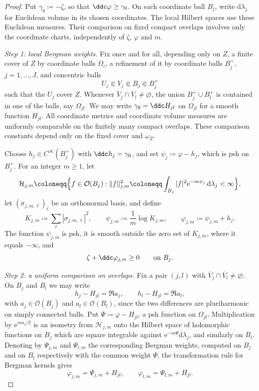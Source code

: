 \begin{proof}
Put $\gamma_0\coloneqq -\zeta$, so that $\ddc\varphi\ge\gamma_0$.
On each coordinate ball $B_j$, write $\mathrm{d}\lambda_j$ for Euclidean
volume in its chosen coordinates. The local Hilbert spaces use these
Euclidean measures. Their comparison on fixed compact overlaps involves
only the coordinate charts, independently of $\zeta$, $\varphi$ and $m$.
 
\emph{Step 1: local Bergman weights.}
Fix once and for all, depending only on $Z$, a finite cover of $Z$ by
coordinate balls $\Omega_i$, a refinement of it by coordinate balls
$B_j^+$, $j=1,\dots,J$, and concentric balls
\[
  U_j\Subset V_j\Subset B_j\Subset B_j^+
\]
such that the $U_j$ cover $Z$. Whenever
$\overline V_j\cap\overline V_l\ne\varnothing$, the union
$B_j^+\cup B_l^+$
is contained in one of the balls, say $\Omega_{jl}$. We may write
$\gamma_0=\ddc H_{jl}$ on $\Omega_{jl}$ for a smooth function $H_{jl}$.
All coordinate metrics and coordinate volume measures are uniformly comparable on the finitely many compact overlaps. These comparison constants depend only on the fixed cover and $\omega_Z$.
 
Choose $h_j\in C^\infty(B_j^+)$ with $\ddc h_j=\gamma_0$, and set
$\psi_j\coloneqq \varphi-h_j$, which is psh on $B_j^+$. For an integer
$m\ge1$, let
\[
  \mathcal H_{j,m}\coloneqq \Bigl\{f\in\mathcal O(B_j):
     \|f\|_{j,m}^2\coloneqq \int_{B_j}|f|^2\mathrm{e}^{-m\psi_j}\,\mathrm{d}\lambda_j<\infty\Bigr\},
\]
let $(\sigma_{j,m,\ell})_\ell$ be an orthonormal basis, and define
\[
  K_{j,m}\coloneqq \sum_\ell|\sigma_{j,m,\ell}|^2,\qquad
  \psi_{j,m}\coloneqq \frac1m\log K_{j,m},\qquad
  \varphi_{j,m}\coloneqq \psi_{j,m}+h_j.
\]
The function $\psi_{j,m}$ is
psh, it is smooth outside the zero set of $K_{j,m}$, where it equals
$-\infty$, and
\begin{equation}\label{nk:eq:reg-local-positivity}
  \zeta+\ddc\varphi_{j,m}\ge0\qquad\text{on }B_j.
\end{equation}
 
\emph{Step 2: a uniform comparison on overlaps.}
Fix a pair $(j,l)$ with $\overline V_j\cap\overline V_l\ne\varnothing$.
On $B_j$ and $B_l$ we may write
\[
  h_j-H_{jl}=\Re a_j,\qquad h_l-H_{jl}=\Re a_l,
\]
with $a_j\in\mathcal O(B_j)$ and $a_l\in\mathcal O(B_l)$, since the two differences
are pluriharmonic on simply connected balls. Put $\Psi\coloneqq \varphi-H_{jl}$,
a psh function on $\Omega_{jl}$. Multiplication by $\mathrm{e}^{ma_j/2}$ is an
isometry from $\mathcal H_{j,m}$ onto the Hilbert space of holomorphic
functions on $B_j$ which are square integrable against
$\mathrm{e}^{-m\Psi}\mathrm{d}\lambda_j$, and similarly on $B_l$. Denoting by $\Psi_{j,m}$ and
$\Psi_{l,m}$ the corresponding Bergman weights, computed on $B_j$ and
on $B_l$ respectively with the common weight $\Psi$, the transformation
rule for Bergman kernels gives
\[
  \varphi_{j,m}=\Psi_{j,m}+H_{jl},\qquad
  \varphi_{l,m}=\Psi_{l,m}+H_{jl}.
\]
 

\end{proof}
